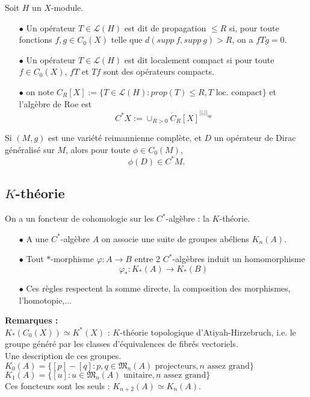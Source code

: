\documentclass{beamer}
\begin{document}
\begin{frame}
\begin{definition}Soit $H$ un $X$-module. 
\begin{itemize}
\item[$\bullet$]Un opérateur $T\in \mathcal L(H)$ est dit de propagation $\leq R$ si, pour toute fonctions $f,g\in C_0(X)$ telle que $d(supp\ f, supp\ g) >R$, on a $fTg=0$.
\item[$\bullet$] Un opérateur $T\in \mathcal L(H)$ est dit localement compact si pour toute $f\in C_0(X)$, $fT$ et $Tf$ sont des opérateurs compacts.
\item[$\bullet$] on note $C_R[X]:=\{T\in \mathcal L(H) : prop(T)\leq R, T \text{ loc. compact}\}$ et l'algèbre de Roe est  \[C^*X:=\overline{\cup_{R>0} C_R[X]}^{||.||_{op}}\]
\end{itemize}
\end{definition}
Si $(M,g)$ est une variété reimannienne complète, et $D$ un opérateur de Dirac généralisé sur $M$, alors pour toute $\phi\in C_0(M)$,
\[\phi(D)\in C^*M.\]
\end{frame}

\subsection{$K$-théorie}
\begin{frame}
On a un foncteur de cohomologie sur les $C^*$-algèbre : la $K$-théorie.
\begin{itemize}
\item[$\bullet$] A une $C^*$-algèbre $A$ on associe une suite de groupes abéliens $K_n(A)$.
\item[$\bullet$] Tout $*$-morphisme $\varphi : A\rightarrow B$ entre $2$ $C^*$-algèbres induit un homomorphisme 
\[\varphi_*: K_*(A)\rightarrow K_*(B)\]
\item[$\bullet$] Ces règles respectent la somme directe, la composition des morphismes, l'homotopie,... 
\end{itemize}
\textbf{Remarques :}\\
$K_*(C_0(X))\simeq K^*(X)$ : $K$-théorie topologique d'Atiyah-Hirzebruch, i.e. le groupe généré par les classes d'équivalences de fibrés vectoriels.\\
Une description de ces groupes.
$K_0(A) = \{[p]-[q] : p,q\in \mathfrak M_n(A) \text{ projecteurs} ,n\text{ assez grand}\}$\\
$K_1(A) = \{[u] : u\in \mathfrak M_n(A) \text{ unitaire} ,n\text{ assez grand}\}$\\
Ces foncteurs sont les seuls : $K_{n+2}(A)\simeq K_n(A)$.
\end{frame}
\end{document}
